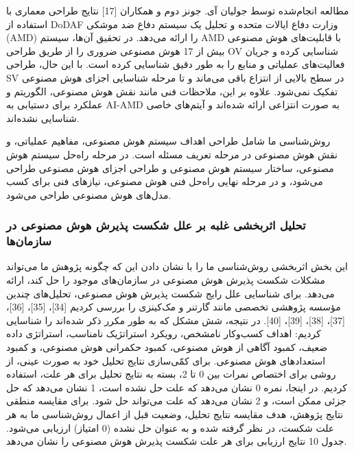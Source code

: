 \documentclass[a4paper,10pt]{article}
\begin{document}
                    مطالعه انجام‌شده توسط جولیان آی. جونز دوم و همکاران [17] نتایج طراحی معماری با استفاده از DoDAF وزارت دفاع ایالات متحده و تحلیل یک سیستم دفاع ضد موشکی (AMD) را ارائه می‌دهد. در تحقیق آن‌ها، سیستم AMD با قابلیت‌های هوش مصنوعی بیش از 17 هوش مصنوعی ضروری را از طریق طراحی OV شناسایی کرده و جریان فعالیت‌های عملیاتی و منابع را به طور دقیق شناسایی کرده است. با این حال، طراحی SV در سطح بالایی از انتزاع باقی می‌ماند و تا مرحله شناسایی اجزای هوش مصنوعی تفکیک نمی‌شود. علاوه بر این، ملاحظات فنی مانند نقش هوش مصنوعی، الگوریتم و عملکرد برای دستیابی به AI-AMD به صورت انتزاعی ارائه شده‌اند و آیتم‌های خاصی شناسایی نشده‌اند.

                    روش‌شناسی ما شامل طراحی اهداف سیستم هوش مصنوعی، مفاهیم عملیاتی، و نقش هوش مصنوعی در مرحله تعریف مسئله است. در مرحله راه‌حل سیستم هوش مصنوعی، ساختار سیستم هوش مصنوعی و طراحی اجزای هوش مصنوعی طراحی می‌شود، و در مرحله نهایی راه‌حل فنی هوش مصنوعی، نیازهای فنی برای کسب مدل‌های هوش مصنوعی طراحی می‌شود.

                \subsubsection{تحلیل اثربخشی غلبه بر علل شکست پذیرش هوش مصنوعی در سازمان‌ها}

                    این بخش اثربخشی روش‌شناسی ما را با نشان دادن این که چگونه پژوهش ما می‌تواند مشکلات شکست پذیرش هوش مصنوعی در سازمان‌های موجود را حل کند، ارائه می‌دهد. برای شناسایی علل رایج شکست پذیرش هوش مصنوعی، تحلیل‌های چندین مؤسسه پژوهشی تخصصی مانند گارتنر و مک‌کینزی را بررسی کردیم [34]، [35]، [36]، [37]، [38]، [39]، [40]. در نتیجه، شش مشکل که به طور مکرر ذکر شده‌اند را شناسایی کردیم: اهداف کسب‌وکار نامشخص، رویکرد استراتژیک نامناسب، استراتژی داده ضعیف، کمبود آگاهی از هوش مصنوعی، کمبود حکمرانی هوش مصنوعی، و کمبود استعدادهای هوش مصنوعی. برای کمّی‌سازی نتایج تحلیل خود به صورت عینی، از روشی برای اختصاص نمرات بین 0 تا 2، بسته به نتایج تحلیل برای هر علت، استفاده کردیم. در اینجا، نمره 0 نشان می‌دهد که علت حل نشده است، 1 نشان می‌دهد که حل جزئی ممکن است، و 2 نشان می‌دهد که علت می‌تواند حل شود. برای مقایسه منطقی نتایج پژوهش، هدف مقایسه نتایج تحلیل، وضعیت قبل از اعمال روش‌شناسی ما به هر علت شکست، در نظر گرفته شده و به عنوان حل نشده (0 امتیاز) ارزیابی می‌شود. جدول 10 نتایج ارزیابی برای هر علت شکست پذیرش هوش مصنوعی را نشان می‌دهد.
\end{document}

